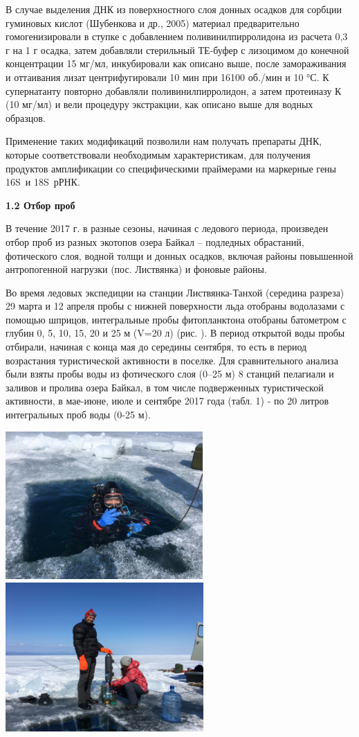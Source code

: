 \documentclass[a4paper,12pt,openany,final]{extreport}
\begin{document}
В случае выделения ДНК из поверхностного слоя донных осадков для сорбции
гуминовых кислот (Шубенкова и др., 2005) материал предварительно
гомогенизировали в ступке с добавлением поливинилпирролидона из расчета
0,3 г на 1 г осадка, затем добавляли стерильный ТЕ-буфер с лизоцимом до
конечной концентрации 15 мг/мл, инкубировали как описано выше, после
замораживания и оттаивания лизат центрифугировали 10 мин при 16100
об./мин и 10 °С. К супернатанту повторно добавляли поливинилпирролидон,
а затем протеиназу К (10 мг/мл) и вели процедуру экстракции, как описано
выше для водных образцов.

Применение таких модификаций позволили нам получать препараты ДНК,
которые соответствовали необходимым характеристикам, для получения
продуктов амплификации со специфическими праймерами на маркерные гены
16S~и 18S~рРНК.

\textbf{1.2 Отбор проб }

В течение 2017 г. в разные сезоны, начиная с ледового периода,
произведен отбор проб из разных экотопов озера Байкал -- подледных
обрастаний, фотического слоя, водной толщи и донных осадков, включая
районы повышенной антропогенной нагрузки (пос. Листвянка) и фоновые
районы.

Во время ледовых экспедиции на станции Листвянка-Танхой (середина
разреза) 29 марта и 12 апреля пробы с нижней поверхности льда отобраны
водолазами с помощью шприцов, интегральные пробы фитопланктона отобраны
батометром с глубин 0, 5, 10, 15, 20 и 25 м (V=20 л) (рис. ). В период
открытой воды пробы отбирали, начиная с конца мая до середины сентября,
то есть в период возрастания туристической активности в поселке. Для
сравнительного анализа были взяты пробы воды из фотического слоя (0--25
м) 8 станций пелагиали и заливов и пролива озера Байкал, в том числе
подверженных туристической активности, в мае-июне, июле и сентябре 2017
года (табл. 1) - по 20 литров интегральных проб воды (0-25 м).

\includegraphics[width=2.96736in,height=2.22778in]{media/image1.jpeg}
\includegraphics[width=2.98125in,height=2.2375in]{media/image2.jpeg}
\end{document}
